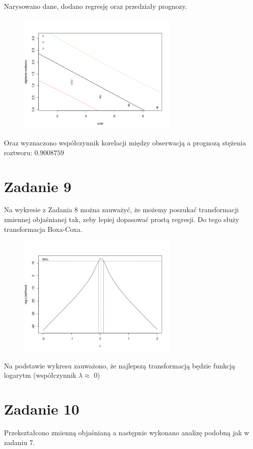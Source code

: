 \documentclass[9pt]{article}  %
\begin{document}
  Narysowano dane, dodano regresję oraz przedziały prognozy.
    \begin{figure}[H]
      \centering
      \includegraphics[width=0.7\textwidth]{8.png}
      \caption {}
    \end{figure} 
    Oraz wyznaczono współczynnik korelacji między obserwacją a prognozą stężenia roztworu: $0.9008759$


\section{Zadanie 9}
  Na wykresie z Zadania 8 można zauważyć, że możemy poszukać transformacji zmiennej objaśnianej tak, zeby lepiej dopasować prostą regresji. Do tego służy transformacja Boxa-Coxa.
    \begin{figure}[H]
      \centering
      \includegraphics[width=0.7\textwidth]{9.png}
      \caption {}
    \end{figure} 
    Na podstawie wykresu zauważono, że najlepszą transformacją będzie funkcją logarytm (współczynnik $\lambda \approx$ 0)

\section{Zadanie 10}
  Przekształcono zmienną objaśnianą a następnie wykonano analizę podobną jak w zadaniu 7. \newline
\end{document}
